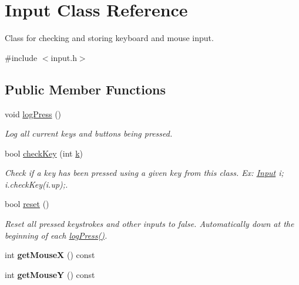\hypertarget{classInput}{}\section{Input Class Reference}
\label{classInput}


Class for checking and storing keyboard and mouse input.  




{\ttfamily \#include $<$input.\+h$>$}

\subsection*{Public Member Functions}
\begin{DoxyCompactItemize}
\item 
void \hyperlink{classInput_a7664a52377e4bda7524d288df481954b}{log\+Press} ()\hypertarget{classInput_a7664a52377e4bda7524d288df481954b}{}\label{classInput_a7664a52377e4bda7524d288df481954b}

\begin{DoxyCompactList}\small\item\em Log all current keys and buttons being pressed. \end{DoxyCompactList}\item 
bool \hyperlink{classInput_a2f5d21366e04e3ce200fe73c6c748dd8}{check\+Key} (int \hyperlink{classInput_aa069678fdc7c45c405c044ed8e45a379}{k})\hypertarget{classInput_a2f5d21366e04e3ce200fe73c6c748dd8}{}\label{classInput_a2f5d21366e04e3ce200fe73c6c748dd8}

\begin{DoxyCompactList}\small\item\em Check if a key has been pressed using a given key from this class. Ex\+: \hyperlink{classInput}{Input} i; i.\+check\+Key(i.\+up);. \end{DoxyCompactList}\item 
bool \hyperlink{classInput_ac4fc1b961553d6ca8a603ee0a53f311c}{reset} ()\hypertarget{classInput_ac4fc1b961553d6ca8a603ee0a53f311c}{}\label{classInput_ac4fc1b961553d6ca8a603ee0a53f311c}

\begin{DoxyCompactList}\small\item\em Reset all pressed keystrokes and other inputs to false. Automatically down at the beginning of each \hyperlink{classInput_a7664a52377e4bda7524d288df481954b}{log\+Press()}. \end{DoxyCompactList}\item 
int {\bfseries get\+MouseX} () const \hypertarget{classInput_a08e8c4c83414948fa86aadda2c206569}{}\label{classInput_a08e8c4c83414948fa86aadda2c206569}

\item 
int {\bfseries get\+MouseY} () const \hypertarget{classInput_a403d5f32a558a76422dba94c1121bd70}{}\label{classInput_a403d5f32a558a76422dba94c1121bd70}

\end{DoxyCompactItemize}
